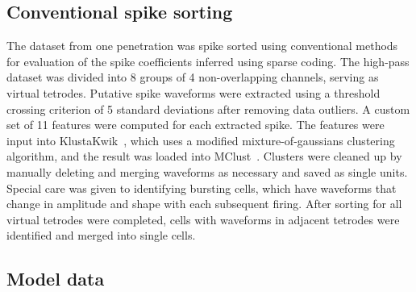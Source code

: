 \subsection{Conventional spike sorting}

The dataset from one penetration was spike sorted using conventional
methods for evaluation of the spike coefficients inferred using sparse
coding. The high-pass dataset was divided into 8 groups of 4
non-overlapping channels, serving as virtual tetrodes. Putative spike
waveforms were extracted using a threshold crossing criterion of 5
standard deviations after removing data outliers. A custom set of 11
features were computed for each extracted spike. The features were
input into KlustaKwik~\cite{Harris:2000fk}, which uses a modified
mixture-of-gaussians clustering algorithm, and the result was loaded
into MClust~\cite{mclust}. Clusters were cleaned up by manually
deleting and merging waveforms as necessary and saved as single
units. Special care was given to identifying bursting cells, which
have waveforms that change in amplitude and shape with each subsequent
firing.  After sorting for all virtual tetrodes were completed, cells
with waveforms in adjacent tetrodes were identified and merged into
single cells.

\subsection{Model data}

